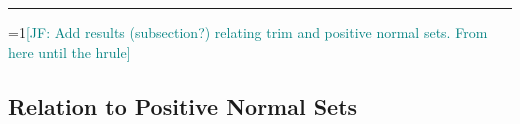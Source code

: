 \documentclass[11pt]{article}
\newcommand{\Comments}{1}
\newcommand{\mynote}[2]{\ifnum\Comments=1\textcolor{#1}{#2}\fi}
\newcommand{\mytodo}[2]{\ifnum\Comments=1%
  \todo[linecolor=#1!80!black,backgroundcolor=#1,bordercolor=#1!80!black]{#2}\fi}
\newcommand{\jessie}[1]{\mynote{teal}{[JF: #1]}}
\newcommand{\btw}[1]{\mytodo{gray!20!white}{BTW: #1}}%
\newcommand{\reals}{\mathbb{R}}
\newcommand{\prop}[1]{\mathrm{prop}[#1]}
\newcommand{\simplex}{\Delta_\Y}
\newcommand{\R}{\mathcal{R}}
\newcommand{\U}{\mathcal{U}}
\newcommand{\Y}{\mathcal{Y}}
\newcommand{\inprod}[2]{\langle #1, #2 \rangle}%
\newcommand{\toto}{\rightrightarrows}
\newcommand{\trim}{\mathrm{trim}}
\newcommand{\red}{\mathrm{red}}
\newcommand{\trimred}{\mathrm{trim}_\red}
\newcommand{\trimcover}{\mathrm{trim}}
\newtheorem{corollary}{Corollary}
\newtheorem{definition}{Definition}
\begin{document}
%
%
%
%
%


\iffalse
\hrule
\bigskip
\jessie{Add results (subsection?) relating trim and positive normal sets.  From here until the hrule}
\subsection{Relation to Positive Normal Sets}
\end{document}
